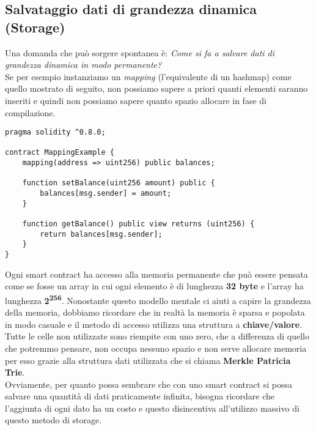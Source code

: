 \subsection{Salvataggio dati di grandezza dinamica (Storage)}
Una domanda che può sorgere spontanea è: \textit{Come si fa a salvare dati di
grandezza dinamica in modo permanente?} \\
Se per esempio instanziamo un \textit{mapping} (l'equivalente di un hashmap)
come quello mostrato di seguito, non possiamo sapere a priori quanti elementi
saranno inseriti e quindi non possiamo sapere quanto spazio allocare in fase di
compilazione.

\begin{lstlisting}[language=Solidity]
pragma solidity ^0.8.0;

contract MappingExample {
    mapping(address => uint256) public balances;

    function setBalance(uint256 amount) public {
        balances[msg.sender] = amount;
    }

    function getBalance() public view returns (uint256) {
        return balances[msg.sender];
    }
}
\end{lstlisting}

Ogni smart contract ha accesso alla memoria permanente che può essere pensata
come se fosse un array in cui ogni elemento è di lunghezza \textbf{32 byte} e
l'array ha lunghezza \textbf{2\textsuperscript{256}}. Nonostante questo modello
mentale ci aiuti a capire la grandezza della memoria, dobbiamo ricordare che in
realtà la memoria è sparsa e popolata in modo casuale e il metodo di accesso
utilizza una struttura a \textbf{chiave/valore}. Tutte le celle non utilizzate
sono riempite con uno zero, che a differenza di quello che potremmo pensare,
non occupa nessuno spazio e non serve allocare memoria per esso grazie alla
struttura dati utilizzata che si chiama \textbf{Merkle Patricia Trie}. \\
Ovviamente, per quanto possa sembrare che con uno smart contract si possa 
salvare una quantità di dati praticamente infinita, bisogna ricordare che 
l'aggiunta di ogni dato ha un costo e questo disincentiva all'utilizzo massivo
di questo metodo di storage.

\newpage

